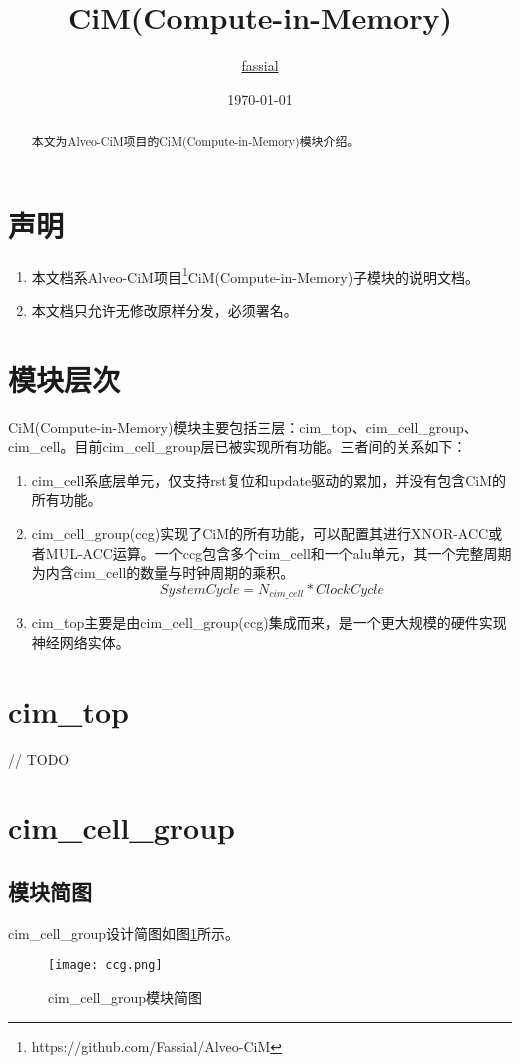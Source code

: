 \documentclass[lang=cn,11pt]{elegantpaper}
\title{CiM(Compute-in-Memory)}
\author{\href{https://github.com/Fassial/}{fassial}}
\date{\today}
\begin{document}
\maketitle

\begin{abstract}
本文为Alveo-CiM项目的CiM(Compute-in-Memory)模块介绍。
\end{abstract}

\section{声明}
\begin{enumerate}
	\item 本文档系Alveo-CiM项目\footnote{https://github.com/Fassial/Alveo-CiM}CiM(Compute-in-Memory)子模块的说明文档。
	\item 本文档只允许无修改原样分发，必须署名。
\end{enumerate}

\section{模块层次}
CiM(Compute-in-Memory)模块主要包括三层：cim\_top、cim\_cell\_group、cim\_cell。目前cim\_cell\_group层已被实现所有功能。三者间的关系如下：
\begin{enumerate}
	\item cim\_cell系底层单元，仅支持rst复位和update驱动的累加，并没有包含CiM的所有功能。
	\item cim\_cell\_group(ccg)实现了CiM的所有功能，可以配置其进行XNOR-ACC或者MUL-ACC运算。一个ccg包含多个cim\_cell和一个alu单元，其一个完整周期为内含cim\_cell的数量与时钟周期的乘积。
	$$
	System Cycle = N_{cim\_cell} * Clock Cycle
	$$
	\item cim\_top主要是由cim\_cell\_group(ccg)集成而来，是一个更大规模的硬件实现神经网络实体。
\end{enumerate}

\section{cim\_top}
// TODO

\section{cim\_cell\_group}
\subsection{模块简图}
cim\_cell\_group设计简图如图\ref{ccg}所示。
\begin{figure}[htbp]
	\centering
	\texttt{[image: ccg.png]}
	\caption{cim\_cell\_group模块简图}
	\label{ccg}
\end{figure}
\end{document}
